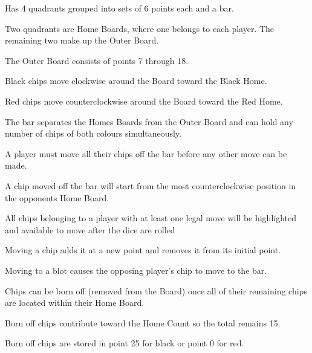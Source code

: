 \documentclass{report}
\begin{document}
\begin{dashed}
    \item Has 4 quadrants grouped into sets of 6 points each and a bar.
    \item Two quadrants are Home Boards, where one belongs to each player. The remaining two make up the Outer Board.
    \item The Outer Board consists of points 7 through 18.
    \item Black chips move clockwise around the Board toward the Black Home.
    \item Red chips move counterclockwise around the Board toward the Red Home.
    \item The bar separates the Homes Boards from the Outer Board and can hold any number of chips of both colours simultaneously.
    \item A player must move all their chips off the bar before any other move can be made.
    \item A chip moved off the bar will start from the most counterclockwise position in the opponents Home Board.
    \item All chips belonging to a player with at least one legal move will be highlighted and available to move after the dice are rolled
    \item Moving a chip adds it at a new point and removes it from its initial point.
    \item Moving to a blot causes the opposing player’s chip to move to the bar.
    \item Chips can be born off (removed from the Board) once all of their remaining chips are located within their Home Board.
    \item Born off chips contribute toward the Home Count so the total remains 15.
    \item Born off chips are stored in point 25 for black or point 0 for red.
\end{dashed}

\end{document}
